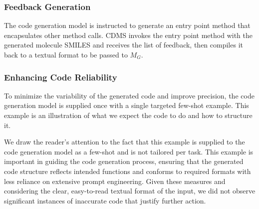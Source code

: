 \documentclass[10pt]{article} %
\begin{document}
    \subsubsection{Feedback Generation}
    The code generation model is instructed to generate an entry point method that encapsulates other method calls. CDMS invokes the entry point method with the generated molecule SMILES and receives the list of feedback, then compiles it back to a textual format to be passed to $M_G$.

    \subsubsection{Enhancing Code Reliability}
    \label{sec:enhancing_code_stability}

    To minimize the variability of the generated code and improve precision, the code generation model is supplied once with a single targeted few-shot example. This example is an illustration of what we expect the code to do and how to structure it.
    
    We draw the reader's attention to the fact that this example is supplied to the code generation model as a few-shot and is not tailored per task. This example is important in guiding the code generation process, ensuring that the generated code structure reflects intended functions and conforms to required formats with less reliance on extensive prompt engineering. Given these measures and considering the clear, easy-to-read textual format of the input, we did not observe significant instances of inaccurate code that justify further action.
    
\end{document}

